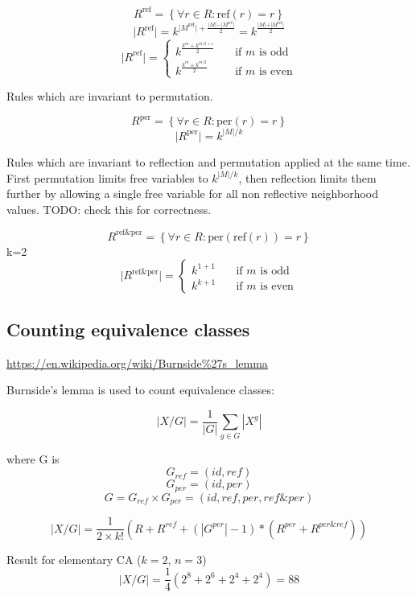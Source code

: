 \documentclass{ijuc}
\begin{document}
\[ R^\mathrm{ref} = \left\{ \forall r \in R : \mathrm{ref}(r) = r \right\} \]
\[ \vert R^\mathrm{ref} \vert = k^{ \vert M^\mathrm{ref} \vert + \frac{\vert M \vert - \vert M^\mathrm{ref} \vert}{2} } = k^{ \frac{\vert M \vert + \vert M^\mathrm{ref} \vert}{2} } \]
\[ \vert R^\mathrm{ref} \vert = \left\{ 
  \begin{array}{ll}
    k^{\frac{k^m + k^{m/2+1}}{2}} & \quad \textrm{if $m$ is odd }\\
    k^{\frac{k^m + k^{m/2  }}{2}} & \quad \textrm{if $m$ is even}
  \end{array} \right.
\]

Rules which are invariant to permutation.

\[ R^\mathrm{per} = \left\{ \forall r \in R : \mathrm{per}(r) = r \right\} \]
\[ \vert R^\mathrm{per} \vert = k^{\vert M \vert / k} \]

Rules which are invariant to reflection and permutation applied at the same time.
First permutation limits free variables to \(k^{\vert M \vert / k}\), then reflection
limits them further by allowing a single free variable for all non reflective neighborhood values.
TODO: check this for correctness.

\[ R^\mathrm{ref \& per} = \left\{ \forall r \in R : \mathrm{per}(\mathrm{ref}(r)) = r \right\} \]
k=2
\[ \vert R^\mathrm{ref \& per} \vert = \left\{ 
  \begin{array}{ll}
    k^{1 + 1} & \quad \textrm{if $m$ is odd }\\
    k^{k + 1} & \quad \textrm{if $m$ is even}
  \end{array} \right.
\]
\subsection{Counting equivalence classes}

\url{https://en.wikipedia.org/wiki/Burnside%27s_lemma}

Burnside's lemma is used to count equivalence classes:

\[ |X/G| = \frac{1}{|G|}\sum_{g \in G}|X^g| \]

where G is 
\[ G_{ref} = (id, ref) \]
\[ G_{per} = (id, per) \]
\[ G = G_{ref} \times G_{per} = (id, ref, per, ref \& per) \]

\[ |X/G| = \frac{1}{2 \times k!} ( R + R^{ref} + (|G^{per}|-1)*(R^{per} + R^{per \& ref}) ) \]

Result for elementary CA (\(k=2\), \(n=3\))
\[ |X/G| = \frac{1}{4} (2^8 + 2^6 + 2^4 + 2^4) = 88 \]
\end{document}
